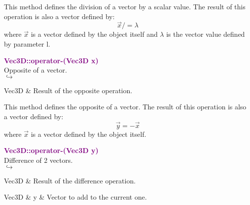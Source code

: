This method defines the division of a vector by a scalar value.
The result of this operation is also a vector defined by:
\begin{equation*}
\overrightarrow{x} /= \lambda
\end{equation*}
where $\overrightarrow{x}$ is a vector defined by the object itself and $\lambda$ is the vector value defined by parameter l.

\textcolor{purple}{\textbf{Vec3D::operator-(Vec3D x)}}\label{Vec3D::operator-(Vec3D x)}\\
Opposite of a vector.\\ \hspace*{5mm}$\hookrightarrow$
\vspace*{-2em}\begin{tcolorbox}[grow to left by=-1cm, width=\textwidth-1cm,myArgs,tabularx={l|R}]
Vec3D & Result of the opposite operation.
\end{tcolorbox}

This method defines the opposite of a vector.
The result of this operation is also a vector defined by:
\begin{equation*}
\overrightarrow{y} = -\overrightarrow{x}
\end{equation*}
where $\overrightarrow{x}$ is a vector defined by the object itself.

\textcolor{purple}{\textbf{Vec3D::operator-(Vec3D y)}}\label{Vec3D::operator-(Vec3D y)}\\
Difference of 2 vectors.\\ \hspace*{5mm}$\hookrightarrow$
\vspace*{-2em}\begin{tcolorbox}[grow to left by=-1cm, width=\textwidth-1cm,myArgs,tabularx={l|R}]
Vec3D & Result of the difference operation.
\end{tcolorbox}

\begin{tcolorbox}[width=\textwidth,myArgs,tabularx={ll|R}]
Vec3D & y & Vector to add to the current one.
\end{tcolorbox}

